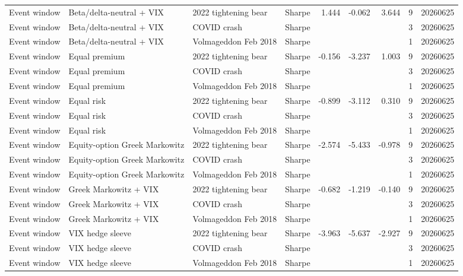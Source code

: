 \begin{tabular}{llllrrrrr}
Event window & Beta/delta-neutral + VIX & 2022 tightening bear & Sharpe & 1.444 & -0.062 & 3.644 & 9 & 20260625 \\
Event window & Beta/delta-neutral + VIX & COVID crash & Sharpe &  &  &  & 3 & 20260625 \\
Event window & Beta/delta-neutral + VIX & Volmageddon Feb 2018 & Sharpe &  &  &  & 1 & 20260625 \\
Event window & Equal premium & 2022 tightening bear & Sharpe & -0.156 & -3.237 & 1.003 & 9 & 20260625 \\
Event window & Equal premium & COVID crash & Sharpe &  &  &  & 3 & 20260625 \\
Event window & Equal premium & Volmageddon Feb 2018 & Sharpe &  &  &  & 1 & 20260625 \\
Event window & Equal risk & 2022 tightening bear & Sharpe & -0.899 & -3.112 & 0.310 & 9 & 20260625 \\
Event window & Equal risk & COVID crash & Sharpe &  &  &  & 3 & 20260625 \\
Event window & Equal risk & Volmageddon Feb 2018 & Sharpe &  &  &  & 1 & 20260625 \\
Event window & Equity-option Greek Markowitz & 2022 tightening bear & Sharpe & -2.574 & -5.433 & -0.978 & 9 & 20260625 \\
Event window & Equity-option Greek Markowitz & COVID crash & Sharpe &  &  &  & 3 & 20260625 \\
Event window & Equity-option Greek Markowitz & Volmageddon Feb 2018 & Sharpe &  &  &  & 1 & 20260625 \\
Event window & Greek Markowitz + VIX & 2022 tightening bear & Sharpe & -0.682 & -1.219 & -0.140 & 9 & 20260625 \\
Event window & Greek Markowitz + VIX & COVID crash & Sharpe &  &  &  & 3 & 20260625 \\
Event window & Greek Markowitz + VIX & Volmageddon Feb 2018 & Sharpe &  &  &  & 1 & 20260625 \\
Event window & VIX hedge sleeve & 2022 tightening bear & Sharpe & -3.963 & -5.637 & -2.927 & 9 & 20260625 \\
Event window & VIX hedge sleeve & COVID crash & Sharpe &  &  &  & 3 & 20260625 \\
Event window & VIX hedge sleeve & Volmageddon Feb 2018 & Sharpe &  &  &  & 1 & 20260625 \\
\bottomrule
\end{tabular}
